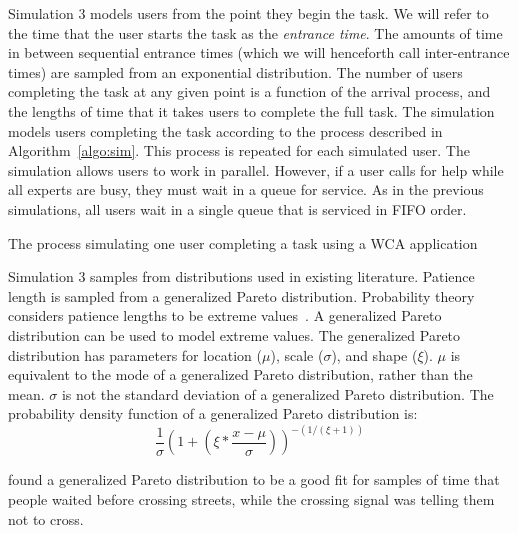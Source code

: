 Simulation 3 models users from the point they begin the task.
We will refer to the time that the user starts the task as the
\emph{entrance time}.
The amounts of time in between sequential entrance times (which we will
henceforth call inter-entrance times) are sampled from an exponential
distribution.
The number of users completing the task at any given point is a function of the
arrival process, and the lengths of time that it takes users to complete the
full task.
The simulation models users completing the task according to the process
described in Algorithm~\ref{algo:sim}.
This process is repeated for each simulated user.
The simulation allows users to work in parallel.
However, if a user calls for help while all experts are busy, they must wait in
a queue for service.
As in the previous simulations, all users wait in a single queue that is
serviced in FIFO order.

\begin{algorithm}[H]
  \caption{
    The process simulating one user completing a task using a WCA application
  }\label{algo:sim}
  \vspace{0.1in}
\end{algorithm}

Simulation 3 samples from distributions used in existing literature.
Patience length is sampled from a generalized Pareto distribution.
Probability theory considers patience lengths to be extreme
values~\cite{patience}.
A generalized Pareto distribution can be used to model extreme values.
The generalized Pareto distribution has parameters for location ($\mu$), scale
($\sigma$), and shape ($\xi$).
$\mu$ is equivalent to the mode of a generalized Pareto distribution, rather than
the mean.
$\sigma$ is not the standard deviation of a generalized Pareto distribution.
The probability density function of a generalized Pareto distribution is:
\[
  \frac{1}{\sigma} \left(1 + \left(\xi * \frac{x - \mu}{\sigma}\right)
  \right)^{-(1/(\xi + 1))}
\]


\citet{patience} found a generalized Pareto distribution to be a good fit for
samples of time that people waited before crossing streets, while the crossing
signal was telling them not to cross.

